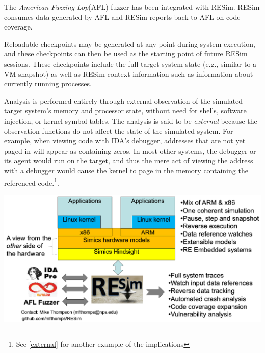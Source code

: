 \documentclass[titlepage]{article}
\begin{document}
The \textit{American Fuzzing Lop}(AFL) fuzzer has been integrated with RESim. RESim consumes data generated by AFL and RESim reports
back to AFL on code coverage.

Reloadable checkpoints may be generated at any point during system execution, and these checkpoints can then be used as the starting point of future RESim 
sessions.  These checkpoints include the full target system state (e.g., similar to a VM snapshot) as well as RESim context information such as
information about currently running processes.
  
Analysis is performed entirely through external observation of the simulated target system's memory and processor state, 
without need for shells, software injection, or kernel symbol tables.   The analysis is said to be \textit{external} because the observation functions do
not affect the state of the simulated system.  For example, when viewing code with IDA's debugger, addresses that are not yet paged in will appear as containing zeros.
In most other systems, the debugger or its agent would run on the target, and thus the mere act of viewing the address with a debugger 
would cause the kernel to page
in the memory containing the referenced code.\footnote{See \ref{external} for another example of the implications}.

\includegraphics{resimfig.eps}
\end{document}
